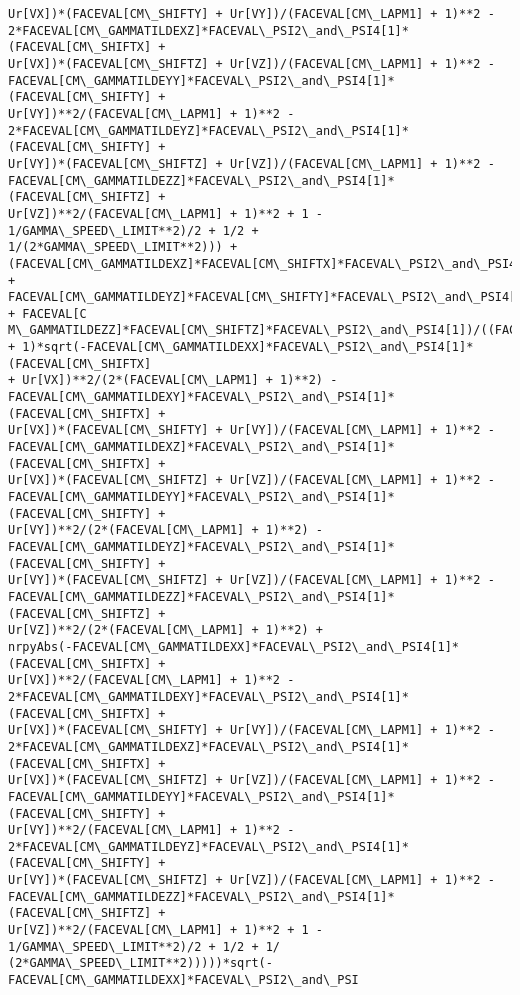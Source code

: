 \documentclass[landscape,letterpaper,10pt,english]{article}
\begin{document}
\begin{Verbatim}[commandchars=\\\{\}]
Ur[VX])*(FACEVAL[CM\_SHIFTY] + Ur[VY])/(FACEVAL[CM\_LAPM1] + 1)**2 -
2*FACEVAL[CM\_GAMMATILDEXZ]*FACEVAL\_PSI2\_and\_PSI4[1]*(FACEVAL[CM\_SHIFTX] +
Ur[VX])*(FACEVAL[CM\_SHIFTZ] + Ur[VZ])/(FACEVAL[CM\_LAPM1] + 1)**2 -
FACEVAL[CM\_GAMMATILDEYY]*FACEVAL\_PSI2\_and\_PSI4[1]*(FACEVAL[CM\_SHIFTY] +
Ur[VY])**2/(FACEVAL[CM\_LAPM1] + 1)**2 -
2*FACEVAL[CM\_GAMMATILDEYZ]*FACEVAL\_PSI2\_and\_PSI4[1]*(FACEVAL[CM\_SHIFTY] +
Ur[VY])*(FACEVAL[CM\_SHIFTZ] + Ur[VZ])/(FACEVAL[CM\_LAPM1] + 1)**2 -
FACEVAL[CM\_GAMMATILDEZZ]*FACEVAL\_PSI2\_and\_PSI4[1]*(FACEVAL[CM\_SHIFTZ] +
Ur[VZ])**2/(FACEVAL[CM\_LAPM1] + 1)**2 + 1 - 1/GAMMA\_SPEED\_LIMIT**2)/2 + 1/2 +
1/(2*GAMMA\_SPEED\_LIMIT**2))) +
(FACEVAL[CM\_GAMMATILDEXZ]*FACEVAL[CM\_SHIFTX]*FACEVAL\_PSI2\_and\_PSI4[1] +
FACEVAL[CM\_GAMMATILDEYZ]*FACEVAL[CM\_SHIFTY]*FACEVAL\_PSI2\_and\_PSI4[1] + FACEVAL[C
M\_GAMMATILDEZZ]*FACEVAL[CM\_SHIFTZ]*FACEVAL\_PSI2\_and\_PSI4[1])/((FACEVAL[CM\_LAPM1]
+ 1)*sqrt(-FACEVAL[CM\_GAMMATILDEXX]*FACEVAL\_PSI2\_and\_PSI4[1]*(FACEVAL[CM\_SHIFTX]
+ Ur[VX])**2/(2*(FACEVAL[CM\_LAPM1] + 1)**2) -
FACEVAL[CM\_GAMMATILDEXY]*FACEVAL\_PSI2\_and\_PSI4[1]*(FACEVAL[CM\_SHIFTX] +
Ur[VX])*(FACEVAL[CM\_SHIFTY] + Ur[VY])/(FACEVAL[CM\_LAPM1] + 1)**2 -
FACEVAL[CM\_GAMMATILDEXZ]*FACEVAL\_PSI2\_and\_PSI4[1]*(FACEVAL[CM\_SHIFTX] +
Ur[VX])*(FACEVAL[CM\_SHIFTZ] + Ur[VZ])/(FACEVAL[CM\_LAPM1] + 1)**2 -
FACEVAL[CM\_GAMMATILDEYY]*FACEVAL\_PSI2\_and\_PSI4[1]*(FACEVAL[CM\_SHIFTY] +
Ur[VY])**2/(2*(FACEVAL[CM\_LAPM1] + 1)**2) -
FACEVAL[CM\_GAMMATILDEYZ]*FACEVAL\_PSI2\_and\_PSI4[1]*(FACEVAL[CM\_SHIFTY] +
Ur[VY])*(FACEVAL[CM\_SHIFTZ] + Ur[VZ])/(FACEVAL[CM\_LAPM1] + 1)**2 -
FACEVAL[CM\_GAMMATILDEZZ]*FACEVAL\_PSI2\_and\_PSI4[1]*(FACEVAL[CM\_SHIFTZ] +
Ur[VZ])**2/(2*(FACEVAL[CM\_LAPM1] + 1)**2) +
nrpyAbs(-FACEVAL[CM\_GAMMATILDEXX]*FACEVAL\_PSI2\_and\_PSI4[1]*(FACEVAL[CM\_SHIFTX] +
Ur[VX])**2/(FACEVAL[CM\_LAPM1] + 1)**2 -
2*FACEVAL[CM\_GAMMATILDEXY]*FACEVAL\_PSI2\_and\_PSI4[1]*(FACEVAL[CM\_SHIFTX] +
Ur[VX])*(FACEVAL[CM\_SHIFTY] + Ur[VY])/(FACEVAL[CM\_LAPM1] + 1)**2 -
2*FACEVAL[CM\_GAMMATILDEXZ]*FACEVAL\_PSI2\_and\_PSI4[1]*(FACEVAL[CM\_SHIFTX] +
Ur[VX])*(FACEVAL[CM\_SHIFTZ] + Ur[VZ])/(FACEVAL[CM\_LAPM1] + 1)**2 -
FACEVAL[CM\_GAMMATILDEYY]*FACEVAL\_PSI2\_and\_PSI4[1]*(FACEVAL[CM\_SHIFTY] +
Ur[VY])**2/(FACEVAL[CM\_LAPM1] + 1)**2 -
2*FACEVAL[CM\_GAMMATILDEYZ]*FACEVAL\_PSI2\_and\_PSI4[1]*(FACEVAL[CM\_SHIFTY] +
Ur[VY])*(FACEVAL[CM\_SHIFTZ] + Ur[VZ])/(FACEVAL[CM\_LAPM1] + 1)**2 -
FACEVAL[CM\_GAMMATILDEZZ]*FACEVAL\_PSI2\_and\_PSI4[1]*(FACEVAL[CM\_SHIFTZ] +
Ur[VZ])**2/(FACEVAL[CM\_LAPM1] + 1)**2 + 1 - 1/GAMMA\_SPEED\_LIMIT**2)/2 + 1/2 + 1/
(2*GAMMA\_SPEED\_LIMIT**2)))))*sqrt(-FACEVAL[CM\_GAMMATILDEXX]*FACEVAL\_PSI2\_and\_PSI

\end{Verbatim}
\end{document}

